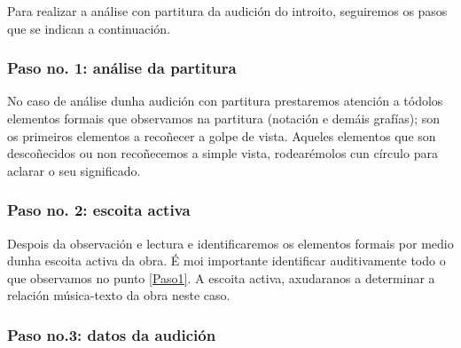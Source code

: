 Para realizar a análise con partitura da audición do introito, seguiremos os pasos que se indican a continuación.
\begin{multicols}{2}
%
\subsubsection*{Paso no. 1: análise da partitura} \label{Paso1}

No caso de análise dunha audición con partitura prestaremos atención a tódolos elementos formais que observamos na partitura (notación e demáis grafías); son os primeiros elementos a recoñecer a golpe de vista.
Aqueles elementos que son descoñecidos ou non recoñecemos a simple vista, rodearémolos cun círculo para aclarar o seu significado.

\subsubsection*{Paso no. 2: escoita activa} \label{Paso2}

Despois da observación e lectura e identificaremos os elementos formais por medio dunha escoita activa da obra.
É moi importante identificar auditivamente todo o que observamos no punto \ref{Paso1}.
A escoita activa, axudaranos a determinar a relación música-texto da obra neste caso.

\subsubsection*{Paso no.3: datos da audición} \label{Paso3}


\end{multicols}
